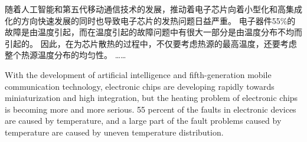 \ifbachelor{
\renewcommand{\bachelorchapterformat}{\centering\fontsize{16pt}{16pt}\selectfont\heiti\thispagestyle{fancy}}}{}
\begin{chineseabstract}
    随着人工智能和第五代移动通信技术的发展，推动着电子芯片向着小型化和高集成化的方向快速发展的同时也导致电子芯片的发热问题日益严重。
    电子器件55\%的故障是由温度引起，而在温度引起的故障问题中有很大一部分是由温度分布不均而引起的。
    因此，在为芯片散热的过程中，不仅要考虑热源的最高温度，还要考虑整个热源温度分布的均匀性。
……

\end{chineseabstract}

\begin{englishabstract}
    With the development of artificial intelligence and fifth-generation mobile communication technology, electronic chips are developing rapidly towards miniaturization and high integration, but the heating problem of electronic chips is becoming more and more serious.
    55 percent of the faults in electronic devices are caused by temperature, and a large part of the fault problems caused by temperature are caused by uneven temperature distribution.

\end{englishabstract}
\ifbachelor{
\renewcommand{\bachelorchapterformat}{\fontsize{16pt}{16pt}\selectfont\heiti\thispagestyle{fancy}}}{}